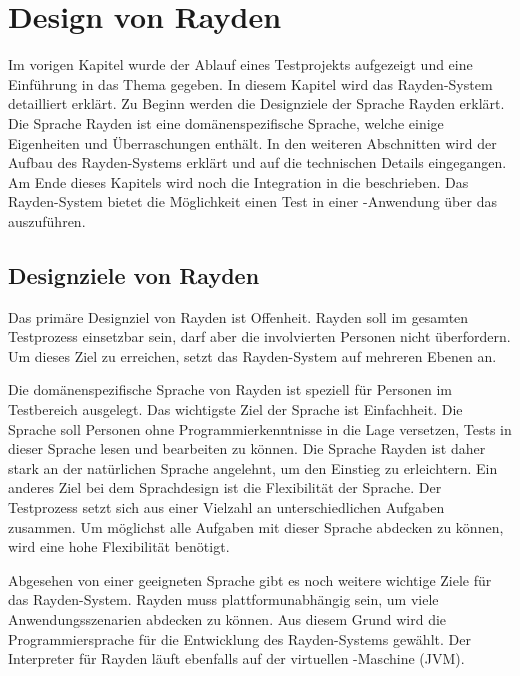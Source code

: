 \chapter{Design von Rayden}
\label{cha:Design}

Im vorigen Kapitel wurde der Ablauf eines Testprojekts aufgezeigt und eine Einführung in das Thema  gegeben. In diesem Kapitel wird das Rayden-System detailliert erklärt. Zu Beginn werden die Designziele der Sprache Rayden erklärt. Die Sprache Rayden ist eine domänenspezifische Sprache, welche einige Eigenheiten und Überraschungen enthält. In den weiteren Abschnitten wird der Aufbau des Rayden-Systems erklärt und auf die technischen Details eingegangen. Am Ende dieses Kapitels wird noch die Integration in die  \cite{JavaScriptApi} beschrieben. Das Rayden-System bietet die Möglichkeit einen Test in einer -Anwendung über das  auszuführen.


\section{Designziele von Rayden}

Das primäre Designziel von Rayden ist Offenheit. Rayden soll im gesamten Testprozess einsetzbar sein, darf aber die involvierten Personen nicht überfordern. Um dieses Ziel zu erreichen, setzt das Rayden-System auf mehreren Ebenen an.

\SuperPar
Die domänenspezifische Sprache von Rayden ist speziell für Personen im Testbereich ausgelegt. Das wichtigste Ziel der Sprache ist Einfachheit. Die Sprache soll Personen ohne Programmierkenntnisse in die Lage versetzen, Tests in dieser Sprache lesen und bearbeiten zu können. Die Sprache Rayden ist daher stark an der natürlichen Sprache angelehnt, um den Einstieg zu erleichtern. Ein anderes Ziel bei dem Sprachdesign ist die Flexibilität der Sprache. Der Testprozess setzt sich aus einer Vielzahl an unterschiedlichen Aufgaben zusammen. Um möglichst alle Aufgaben mit dieser Sprache abdecken zu können, wird eine hohe Flexibilität benötigt. 

\SuperPar
Abgesehen von einer geeigneten Sprache gibt es noch weitere wichtige Ziele für das Rayden-System. Rayden muss plattformunabhängig sein, um viele Anwendungsszenarien abdecken zu können. Aus diesem Grund wird die Programmiersprache  für die Entwicklung des Rayden-Systems gewählt. Der Interpreter für Rayden läuft ebenfalls auf der virtuellen -Maschine (JVM).

